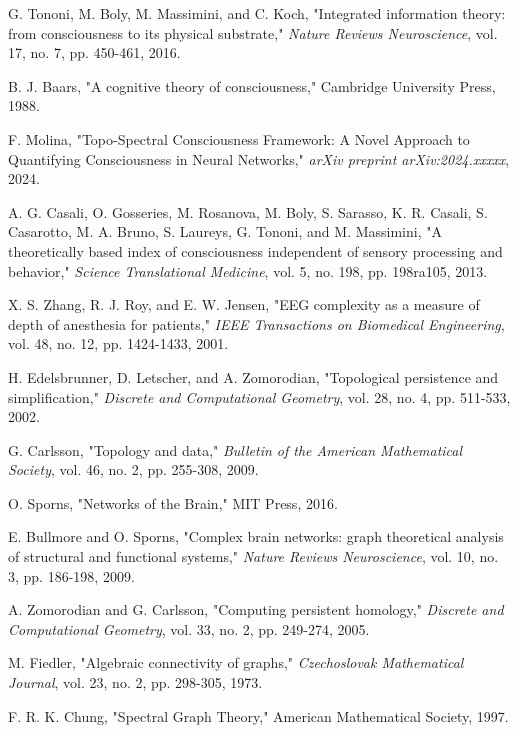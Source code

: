 \documentclass[conference]{IEEEtran}
\begin{document}
\begin{thebibliography}{99}

G. Tononi, M. Boly, M. Massimini, and C. Koch, "Integrated information theory: from consciousness to its physical substrate," \textit{Nature Reviews Neuroscience}, vol. 17, no. 7, pp. 450-461, 2016.

B. J. Baars, "A cognitive theory of consciousness," Cambridge University Press, 1988.

F. Molina, "Topo-Spectral Consciousness Framework: A Novel Approach to Quantifying Consciousness in Neural Networks," \textit{arXiv preprint arXiv:2024.xxxxx}, 2024.

A. G. Casali, O. Gosseries, M. Rosanova, M. Boly, S. Sarasso, K. R. Casali, S. Casarotto, M. A. Bruno, S. Laureys, G. Tononi, and M. Massimini, "A theoretically based index of consciousness independent of sensory processing and behavior," \textit{Science Translational Medicine}, vol. 5, no. 198, pp. 198ra105, 2013.

X. S. Zhang, R. J. Roy, and E. W. Jensen, "EEG complexity as a measure of depth of anesthesia for patients," \textit{IEEE Transactions on Biomedical Engineering}, vol. 48, no. 12, pp. 1424-1433, 2001.

H. Edelsbrunner, D. Letscher, and A. Zomorodian, "Topological persistence and simplification," \textit{Discrete and Computational Geometry}, vol. 28, no. 4, pp. 511-533, 2002.

G. Carlsson, "Topology and data," \textit{Bulletin of the American Mathematical Society}, vol. 46, no. 2, pp. 255-308, 2009.

O. Sporns, "Networks of the Brain," MIT Press, 2016.

E. Bullmore and O. Sporns, "Complex brain networks: graph theoretical analysis of structural and functional systems," \textit{Nature Reviews Neuroscience}, vol. 10, no. 3, pp. 186-198, 2009.

A. Zomorodian and G. Carlsson, "Computing persistent homology," \textit{Discrete and Computational Geometry}, vol. 33, no. 2, pp. 249-274, 2005.

M. Fiedler, "Algebraic connectivity of graphs," \textit{Czechoslovak Mathematical Journal}, vol. 23, no. 2, pp. 298-305, 1973.

F. R. K. Chung, "Spectral Graph Theory," American Mathematical Society, 1997.


\end{thebibliography}
\end{document}

